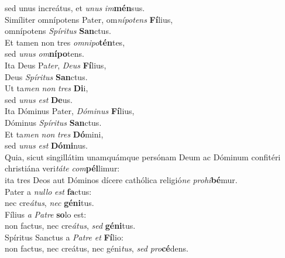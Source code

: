 \evenverse sed unus increátus, et \textit{u}\textit{nus} \textit{im}\textbf{mén}sus.\\
\oddverse Simíliter omnípotens Pater, om\textit{ní}\textit{po}\textit{tens} \textbf{Fí}lius,~\*\\
\oddverse omnípotens \textit{Spí}\textit{ri}\textit{tus} \textbf{San}ctus.\\
\evenverse Et tamen non tres \textit{om}\textit{ni}\textit{po}\textbf{tén}tes,~\*\\
\evenverse sed \textit{u}\textit{nus} \textit{om}\textbf{ní}\textbf{po}tens.\\
\oddverse Ita Deus Pa\textit{ter}, \textit{De}\textit{us} \textbf{Fí}lius,~\*\\
\oddverse Deus \textit{Spí}\textit{ri}\textit{tus} \textbf{San}ctus.\\
\evenverse Ut ta\textit{men} \textit{non} \textit{tres} \textbf{Di}i,~\*\\
\evenverse sed \textit{u}\textit{nus} \textit{est} \textbf{De}us.\\
\oddverse Ita Dóminus Pater, \textit{Dó}\textit{mi}\textit{nus} \textbf{Fí}lius,~\*\\
\oddverse Dóminus \textit{Spí}\textit{ri}\textit{tus} \textbf{San}ctus.\\
\evenverse Et ta\textit{men} \textit{non} \textit{tres} \textbf{Dó}mini,~\*\\
\evenverse sed \textit{u}\textit{nus} \textit{est} \textbf{Dó}\textbf{mi}nus.\\
\oddverse Quia, sicut singillátim unamquámque persónam Deum ac Dóminum confitéri christiána veri\textit{tá}\textit{te} \textit{com}\textbf{pél}limur:~\*\\
\oddverse ita tres Deos aut Dóminos dícere cathólica religió\textit{ne} \textit{pro}\textit{hi}\textbf{bé}mur.\\
\evenverse Pater a \textit{nul}\textit{lo} \textit{est} \textbf{fa}ctus:~\*\\
\evenverse nec cre\textit{á}\textit{tus}, \textit{nec} \textbf{gé}\textbf{ni}tus.\\
\oddverse Fílius \textit{a} \textit{Pa}\textit{tre} \textbf{so}lo est:~\*\\
\oddverse non factus, nec cre\textit{á}\textit{tus}, \textit{sed} \textbf{gé}\textbf{ni}tus.\\
\evenverse Spíritus Sanctus a \textit{Pa}\textit{tre} \textit{et} \textbf{Fí}lio:~\*\\
\evenverse non factus, nec creátus, nec géni\textit{tus}, \textit{sed} \textit{pro}\textbf{cé}dens.\\
